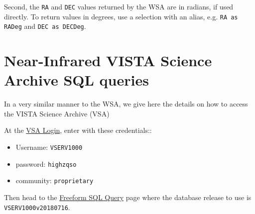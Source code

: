 \documentclass[usenatbib]{mnras}
\begin{document}
Second, the {\tt RA} and {\tt DEC} values returned by the WSA are in radians, if
used directly. To return values in degrees, use a selection with an alias, e.g. 
{\tt RA as RADeg} and {\tt DEC as DECDeg}.

\onecolumn

\twocolumn


\section{Near-Infrared VISTA Science Archive SQL queries}\label{sec:SQL}
In a very similar manner to the WSA, we give here the details on how to access
the VISTA Science Archive (VSA)

At the \href{http://horus.roe.ac.uk/vsa/login.html}{VSA Login}, enter 
with these credentials::
\begin{itemize}
    \item Username: {\tt VSERV1000} 
    \item password: {\tt highzqso} 
    \item community: {\tt proprietary}
\end{itemize}
Then head to the \href{http://horus.roe.ac.uk:8080/vdfs/VSQL_form.jsp}{Freeform SQL Query} page where the database release to use is {\tt VSERV1000v20180716}. 

%






%
%


\end{document}
